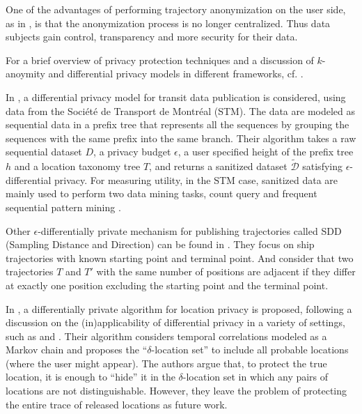 \documentclass{llncs}
\begin{document}
One of the advantages of performing trajectory anonymization on the user side, as in \cite{Romero-Tris2016}, is that the anonymization process is no longer centralized. Thus data subjects gain control, transparency and more security for their data.


For a brief overview of privacy protection techniques and a discussion of $k$-anoymity and differential privacy models in different frameworks, cf. \cite{Salas:2018}.


In \cite{Chen:2012}, a differential privacy model for transit data publication is considered, using data from the Soci\'{e}t\'{e} de Transport de Montr\'{e}al (STM). The data are modeled as sequential data in a prefix tree that represents all the sequences by grouping the sequences with the same prefix into the same branch.
Their algorithm takes a raw sequential dataset $D$, a privacy budget $\epsilon$, a user specified height of the prefix tree $h$ and a location taxonomy tree $T$, and returns a sanitized dataset $\tilde{\mathcal{D}}$ satisfying $\epsilon$-differential privacy.
For measuring utility, in the STM case, sanitized data are mainly used to perform two
data mining tasks, count query and frequent sequential pattern mining \cite{Agrawal:1995}.


Other $\epsilon$-differentially private mechanism for publishing trajectories called SDD (Sampling Distance and Direction) can be found in \cite{Jiang:2013}.
They focus on ship trajectories with known starting point and terminal point.
And consider that two trajectories $T$ and $T'$ with the same number of positions are adjacent if they differ at exactly one position excluding the starting point and the terminal point.


In \cite{Xiao:2015}, a differentially private algorithm for location privacy is proposed, following a discussion on the (in)applicability of differential privacy in a variety of settings, such as \cite{Chatzik:2013} and  \cite{Kifer:2011}.
Their algorithm considers temporal correlations modeled as a Markov chain and proposes the ``$\delta$-location set'' to include all probable locations (where the user might appear). The authors argue that, to protect the true location, it is enough to “hide” it in the $\delta$-location set in which any pairs of locations are not distinguishable.
However, they leave the problem of protecting the entire trace of released locations as future work.
\end{document}
